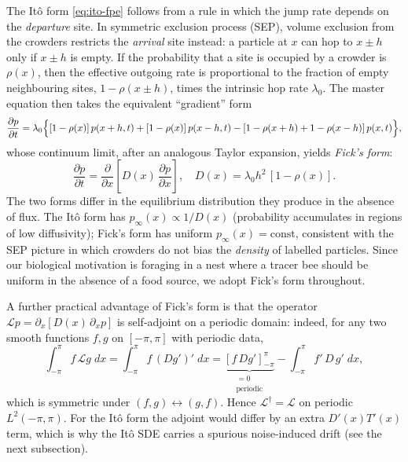 The It\^o form \eqref{eq:ito-fpe} follows from a rule in which the jump rate
depends on the \emph{departure} site.  In symmetric exclusion process (SEP), volume exclusion from the crowders restricts the \emph{arrival} site instead: a particle
at $x$ can hop to $x\pm h$ only if $x\pm h$ is empty.  If the probability that a
site is occupied by a crowder is $\rho(x)$, then the effective outgoing rate is
proportional to the fraction of empty neighbouring sites, $1-\rho(x\pm h)$,
times the intrinsic hop rate $\lambda_0$.  The master equation then takes the
equivalent ``gradient'' form\\[-.5ex]
\[
\frac{\partial p}{\partial t}
=\lambda_0\Bigl\{[1-\rho(x)]\,p(x+h,t) + [1-\rho(x)]\,p(x-h,t) - [1-\rho(x+h) + 1-\rho(x-h)]\,p(x,t)\Bigr\},
\]
whose continuum limit, after an analogous Taylor expansion, yields
\emph{Fick's form}:
\begin{equation}
{\;
\frac{\partial p}{\partial t}
= \frac{\partial}{\partial x}\!\left[D(x)\,\frac{\partial p}{\partial x}\right],
\quad D(x)=\lambda_0 h^2\,[1-\rho(x)].
\;}
\label{eq:fick-fpe}
\end{equation}
The two forms differ in the equilibrium distribution they produce in the absence
of flux.  The It\^o form has $p_\infty(x)\propto 1/D(x)$ (probability accumulates
in regions of low diffusivity); Fick's form has uniform
$p_\infty(x)=\mathrm{const}$, consistent with the SEP picture in which crowders
do not bias the \emph{density} of labelled particles.  Since our biological
motivation is foraging in a nest where a tracer bee should be uniform in the
absence of a food source, we adopt Fick's form throughout.



%

A further practical advantage of Fick's form is that the operator
$\mathcal{L}p=\partial_x[D(x)\,\partial_x p]$ is self-adjoint on a periodic
domain: indeed, for any two smooth functions $f,g$ on $[-\pi,\pi]$ with periodic
data,
\[
\int_{-\pi}^{\pi} f\,\mathcal{L}g\;dx
=\int_{-\pi}^{\pi} f\,(Dg')'\;dx
=\underbrace{[f\,Dg']_{-\pi}^{\pi}}_{\substack{=0\\\text{periodic}}}
-\int_{-\pi}^{\pi} f'\,D\,g'\;dx,
\]
which is symmetric under $(f,g)\leftrightarrow(g,f)$.  Hence
$\mathcal{L}^\dagger=\mathcal{L}$ on periodic $L^2(-\pi,\pi)$.  For the It\^o
form the adjoint would differ by an extra $D'(x)T'(x)$ term, which is why the
It\^o SDE carries a spurious noise-induced drift (see the next subsection).

